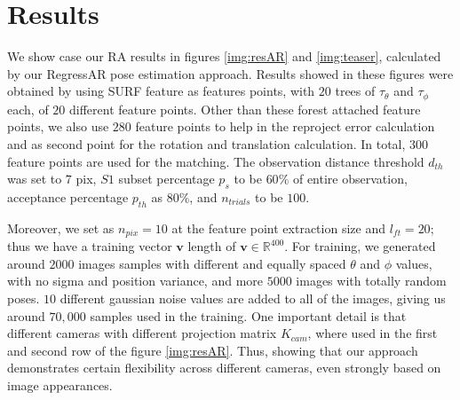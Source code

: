 \documentclass[annual]{acmsiggraph}
\begin{document}
\section{Results}
\label{sec:results}


We show case our RA results in figures \ref{img:resAR} and \ref{img:teaser}, calculated by our RegressAR pose estimation approach. Results showed in these figures were obtained by using SURF feature \cite{Bay:2008} as features points, with $20$ trees of $\tau_{\theta}$ and $\tau_{\phi}$ each, of $20$ different feature points. Other than these forest attached feature points, we also use $280$ feature points to help in the reproject error calculation and as second point for the rotation and translation calculation. In total, $300$ feature points are used for the matching. The observation distance threshold $d_{th}$ was set to $7$ pix, $S1$ subset percentage $p_{s}$ to be $60\%$ of entire observation, acceptance percentage $p_{th}$ as $80\%$, and $n_{trials}$ to be $100$.  

Moreover, we set as $n_{pix} = 10$ at the feature point extraction size and $l_{ft} = 20$; thus we have a training vector $\mathbf{v}$ length of $\mathbf{v} \in \mathbb{R}^{400}$.  For training, we generated around $2000$ images samples with different and equally spaced $\theta$ and $\phi$ values, with no sigma and position variance, and more $5000$ images with totally random poses. $10$ different gaussian noise values are added to all of the images, giving us around $70,000$ samples used in the training. One important detail is that different cameras with different projection matrix $K_{cam}$, where used in the first and second row of the figure \ref{img:resAR}. Thus, showing that our approach demonstrates certain flexibility across different cameras, even strongly based on image appearances.


\end{document}
